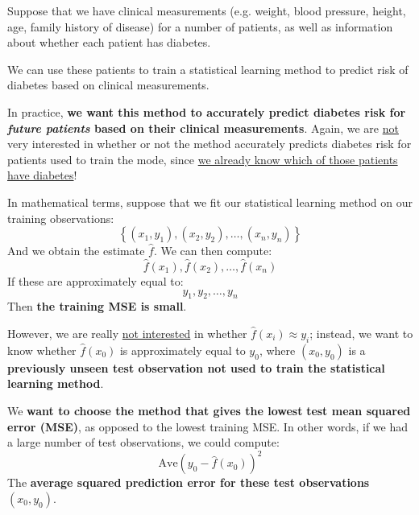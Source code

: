 \documentclass[a4paper]{article}
\newcommand{\definition}[1]{\textcolor{Red3}{\textbf{#1}}\index{#1}}
\newcommand{\highspace}{\vspace{1.2em}\noindent}
\begin{document}
    \newpage

    \begin{examplebox}
        Suppose that we have clinical measurements (e.g. weight, blood pressure, height, age, family history of disease) for a number of patients, as well as information about whether each patient has diabetes.

        \highspace
        We can use these patients to train a statistical learning method to predict risk of diabetes based on clinical measurements.

        \highspace
        In practice, \textbf{we want this method to accurately predict diabetes risk for \emph{future patients} based on their clinical measurements}. Again, we are \underline{not} very interested in whether or not the method accurately predicts diabetes risk for patients used to train the mode, since \underline{we already know which of those patients have diabetes}!
    \end{examplebox}

    \noindent
    In mathematical terms, suppose that we fit our statistical learning method on our training observations:
    \begin{equation*}
        \left\{\left(x_{1}, y_{1}\right), \left(x_{2}, y_{2}\right), \dots, \left(x_{n}, y_{n}\right)\right\}
    \end{equation*}
    And we obtain the estimate $\hat{f}$. We can then compute:
    \begin{equation*}
        \hat{f}\left(x_{1}\right), \hat{f}\left(x_{2}\right), \dots, \hat{f}\left(x_{n}\right)
    \end{equation*}
    If these are approximately equal to:
    \begin{equation*}
        y_{1}, y_{2}, \dots, y_{n}
    \end{equation*}
    Then \textbf{the training MSE is small}.

    \highspace
    However, we are really \underline{not interested} in whether $\hat{f}\left(x_{i}\right) \approx y_{i}$; instead, we want to know whether $\hat{f}\left(x_{0}\right)$ is approximately equal to $y_{0}$, where $\left(x_{0}, y_{0}\right)$ is a \textbf{previously unseen test observation not used to train the statistical learning method}.

    We \textbf{want to choose the method that gives the lowest} \definition{test mean squared error (MSE)}, as opposed to the lowest training MSE. In other words, if we had a large number of test observations, we could compute:
    \begin{equation}
        \mathrm{Ave}\left(y_{0} - \hat{f}\left(x_{0}\right)\right)^{2}
    \end{equation}
    The \textbf{average squared prediction error for these test observations} $\left(x_{0}, y_{0}\right)$.
\end{document}

